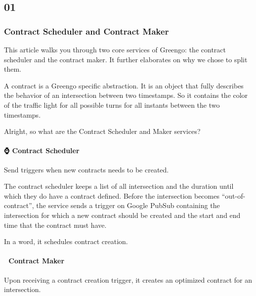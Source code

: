 \documentclass[letterpaper,10pt,english]{sphinxmanual}
\begin{document}
\subsection{01}
\label{\detokenize{blog/2020/01/index:id1}}\label{\detokenize{blog/2020/01/index::doc}}

\subsubsection{Contract Scheduler and Contract Maker}
\label{\detokenize{blog/2020/01/contract_maker_vs_contract_scheduler:contract-scheduler-and-contract-maker}}\label{\detokenize{blog/2020/01/contract_maker_vs_contract_scheduler::doc}}
\begin{figure}[htbp]
\centering

\noindent{}
\end{figure}

This article walks you through two core services of Greengo: the contract scheduler and the contract maker. It further elaborates on why we chose to split them.

 A contract is a Greengo specific abstraction. It is an object that fully describes the behavior of an intersection between two timestamps. So it contains the color of the traffic light for all possible turns for all instants between the two timestamps.

Alright, so what are the Contract Scheduler and Maker services?


\paragraph{⌚ Contract Scheduler}
\label{\detokenize{blog/2020/01/contract_maker_vs_contract_scheduler:contract-scheduler}}
 Send triggers when new contracts needs to be created.

The contract scheduler keeps a list of all intersection and the duration until which they do have a contract defined. Before the intersection becomes “out-of-contract”, the service sends a trigger on Google PubSub containing the intersection for which a new contract should be created and the start and end time that the contract must have.

In a word, it schedules contract creation.


\paragraph{📝 Contract Maker}
\label{\detokenize{blog/2020/01/contract_maker_vs_contract_scheduler:contract-maker}}
 Upon receiving a contract creation trigger, it creates an optimized contract for an intersection.
\end{document}
